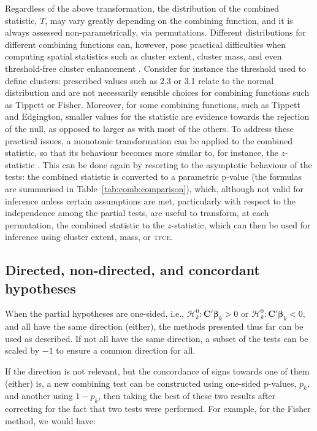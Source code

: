 Regardless of the above transformation, the distribution of the combined statistic, $T$, may vary greatly depending on the combining function, and it is always assessed non-parametrically, via permutations. Different distributions for different combining functions can, however, pose practical difficulties when computing spatial statistics such as cluster extent, cluster mass, and even threshold-free cluster enhancement \citep[\textsc{tfce},][]{Smith2009}. Consider for instance the threshold used to define clusters: prescribed values such as 2.3 or 3.1 \citep{Woo2014} relate to the normal distribution and are not necessarily sensible choices for combining functions such as Tippett or Fisher. Moreover, for some combining functions, such as Tippett and Edgington, smaller values for the statistic are evidence towards the rejection of the null, as opposed to larger as with most of the others. To address these practical issues, a monotonic transformation can be applied to the combined statistic, so that its behaviour becomes more similar to, for instance, the $z$-statistic \citep{Efron2004}. This can be done again by resorting to the asymptotic behaviour of the tests: the combined statistic is converted to a parametric p-value (the formulas are summarised in Table~\ref{tab:comb:comparison}), which, although not valid for inference unless certain assumptions are met, particularly with respect to the independence among the partial tests, are useful to transform, at each permutation, the combined statistic to the $z$-statistic, which can then be used for inference using cluster extent, mass, or \textsc{tfce}.

\subsection{Directed, non-directed, and concordant hypotheses}
\label{sec:comb:directed}

When the partial hypotheses are one-sided, i.e., $\mathcal{H}^{0}_{k} : \mathbf{C}'\boldsymbol{\beta}_{k} > 0$ or $\mathcal{H}^{0}_{k} : \mathbf{C}'\boldsymbol{\beta}_{k} < 0$, and all have the same direction (either), the methods presented thus far can be used as described. If not all have the same direction, a subset of the tests can be scaled by $-1$ to ensure a common direction for all.

If the direction is not relevant, but the concordance of signs towards one of them (either) is, a new combining test can be constructed using one-sided p-values, $p_k$, and another using $1-p_k$, then taking the best of these two results after correcting for the fact that two tests were performed. For example, for the Fisher method, we would have:

